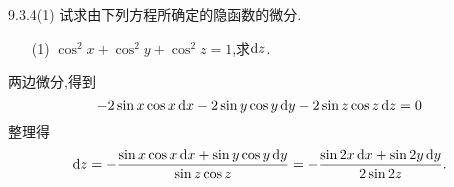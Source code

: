 \begin{exercise}
    {9.3.4(1)}
    试求由下列方程所确定的隐函数的微分.
    \begin{enumerate}
        \item[(1)] $\cos^2 x + \cos^2 y + \cos^2 z = 1$,求$\operatorname{d\!} z$.
    \end{enumerate}
\end{exercise}

\begin{solution}
    两边微分,得到
    \[
    -2 \sin x \cos x \operatorname{d\!} x - 2 \sin y \cos y \operatorname{d\!} y - 2 \sin z \cos z \operatorname{d\!} z = 0
    \]
    整理得
    \[
    \operatorname{d\!} z = - \frac{\sin x \cos x \operatorname{d\!} x + \sin y \cos y \operatorname{d\!} y}{\sin z \cos z} = - \frac{ \sin 2x \operatorname{d\!} x + \sin 2y \operatorname{d\!} y}{2 \sin 2z}.
    \]
\end{solution}